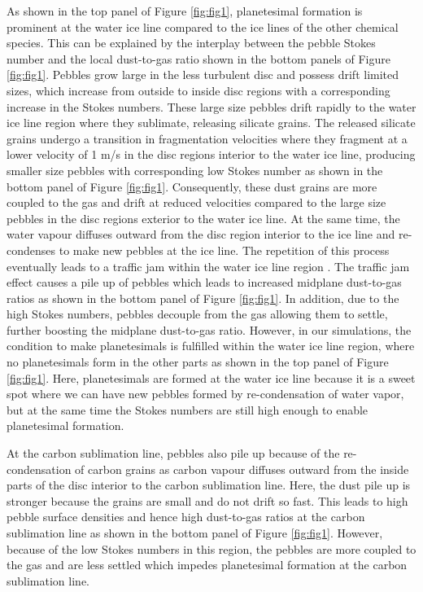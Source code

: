 \documentclass{aa}
\begin{document}
As shown in the top panel of Figure \ref{fig:fig1}, planetesimal formation is prominent at the water ice line compared to the ice lines of the other chemical species. This can be explained by the interplay between the pebble Stokes number and the local dust-to-gas ratio  shown in the bottom panels of Figure \ref{fig:fig1}. Pebbles grow large in the less turbulent disc and possess drift limited sizes, which increase from outside to inside disc regions with a corresponding increase in the Stokes numbers. These large size pebbles drift rapidly to the water ice line region where they sublimate, releasing silicate grains. The released silicate grains undergo a transition in fragmentation velocities where they fragment at a lower velocity of 1 m/s in the disc regions interior to the water ice line, producing smaller size pebbles  with corresponding low Stokes number as shown in the bottom panel of Figure \ref{fig:fig1}. Consequently, these dust grains are more coupled to the gas and drift at reduced velocities compared to the large size pebbles in the disc regions exterior to the water ice line.  At the same time, the water vapour diffuses outward from the disc region interior to the ice line and re-condenses to make new pebbles at the ice line. The repetition of this process eventually leads to a traffic jam within the water ice line region \citep[see also][]{Pinilla2016, DrazkowskaAlibert2017}. The traffic jam effect causes a pile up of pebbles which leads to increased midplane dust-to-gas ratios as shown in the bottom panel of Figure \ref{fig:fig1}. In addition, due to the high Stokes numbers, pebbles decouple from the gas allowing them to settle, further boosting the midplane dust-to-gas ratio. However, in our simulations, the condition to make planetesimals is fulfilled within the water ice line region,  where no planetesimals form in the other parts as shown in the top panel  of Figure \ref{fig:fig1}. Here, planetesimals are formed at the water ice line because it is a sweet spot where we can have new pebbles formed by re-condensation of water vapor, but at the same time the Stokes numbers are still high enough to enable planetesimal formation. 

At the carbon sublimation line, pebbles also pile up because of the re-condensation of carbon grains as carbon vapour diffuses outward from the inside parts of the disc interior to the carbon sublimation line. Here, the dust pile up is stronger because the grains are small and do not drift so fast. This leads to high pebble surface densities and hence high dust-to-gas ratios at the carbon sublimation line as shown in the bottom panel of Figure \ref{fig:fig1}. However, because of the low Stokes numbers in this region, the pebbles are more coupled to the gas and are less settled which impedes planetesimal formation at the carbon sublimation line.
\end{document}
